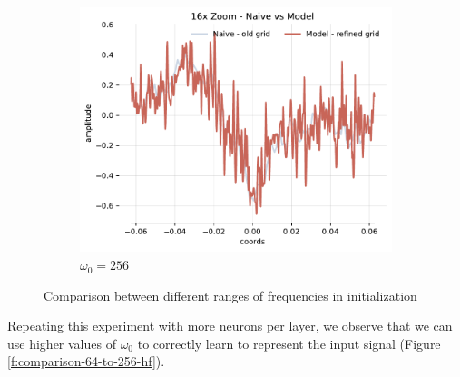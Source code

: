 \begin{figure}[h]
\begin{subfigure}[b]{0.32\textwidth}
        \centering
        \includegraphics[width=\textwidth]{img/ch3/16x-zoom-1hl-32hf-256hz.pdf}
        \caption{$\omega_0=256$}
        \label{fig:16x-zoom-1hl-32hf-256hz}
    \end{subfigure}
    \caption{Comparison between different ranges of frequencies in initialization}
    \label{f:comparison-8-to-256-hz}
\end{figure}


Repeating this experiment with more neurons per layer, we observe that we can use higher values of $\omega_0$ to correctly learn to represent the input signal (Figure \ref{f:comparison-64-to-256-hf}).



